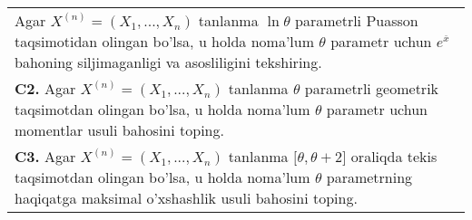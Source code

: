 \documentclass{article}
\begin{document}
\begin{tabular}{m{17cm}}
Agar \(X^{(n)} = \left( X_{1},...,X_{n} \right)\) tanlanma \(\ln\theta\) parametrli Puasson taqsimotidan olingan bo'lsa, u holda noma'lum \(\theta\) parametr uchun \(e^{\overline{x}}\) bahoning siljimaganligi va asosliligini tekshiring.
\\
\textbf{C2.} 
Agar \(X^{(n)} = \left( X_{1},...,X_{n} \right)\) tanlanma \(\theta\) parametrli geometrik taqsimotdan olingan bo'lsa, u holda noma'lum \(\theta\) parametr uchun momentlar usuli bahosini toping.
\\
\textbf{C3.} 
Agar \(X^{(n)} = \left( X_{1},...,X_{n} \right)\) tanlanma \(\lbrack\theta,\theta + 2\rbrack\) oraliqda tekis taqsimotdan olingan bo'lsa, u holda noma'lum \(\theta\) parametrning haqiqatga maksimal o'xshashlik usuli bahosini toping.
\\

\end{tabular}
\vspace{1cm}
\end{document}
